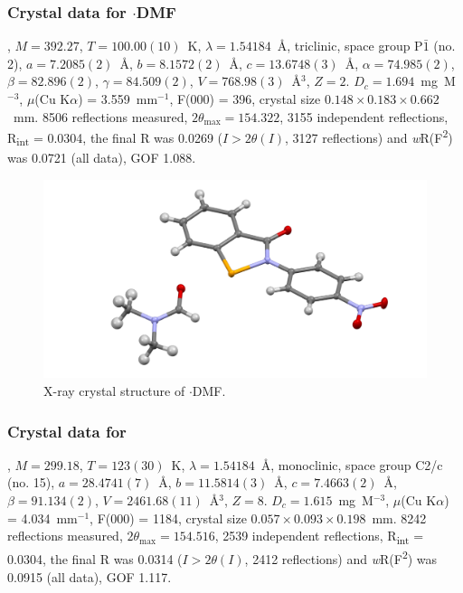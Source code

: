 \begin{refsection}
\subsubsection{Crystal data for \texorpdfstring{$\cdot$DMF}{C16 H15 N3 O4 Se}}
, $M=392.27$, $T=100.00(10)$~K, $\lambda=1.54184$~\AA, triclinic, space group P$\bar{1}$ (no. 2), $a = 7.2085(2)$~\AA, $b = 8.1572(2)$~\AA, $c = 13.6748(3)$~\AA, $\alpha = 74.985(2)$\degree, $\beta = 82.896(2)$\degree, $\gamma = 84.509(2)$\degree, $V = 768.98(3)$~\AA$^{3}$, $Z = 2$. $D_{c}= 1.694$~mg~M$^{-3}$, $\mu$(Cu K$\alpha$) = 3.559~mm$^{-1}$, F(000) = 396, crystal size $0.148 \times 0.183 \times 0.662$~mm. 8506 reflections measured, $2\theta_{\mathrm{max}}=154.322$\degree, 3155 independent reflections, R\textsubscript{int} = 0.0304, the final R was 0.0269 ($I > 2\theta(I)$, 3127 reflections) and \emph{w}R(F\textsuperscript{2}) was 0.0721 (all data), GOF 1.088.

\begin{figure}
  \includegraphics[width=0.6\linewidth]{Figures/ebs-4no2-dmf-xtal.pdf}
  \caption{X-ray crystal structure of \texorpdfstring{$\cdot$DMF}{C16 H15 N3 O4 Se}.}
\end{figure}

\subsubsection{Crystal data for \texorpdfstring{}{C14 H8 N2 O Se}}
, $M=299.18$, $T=123(30)$~K, $\lambda=1.54184$~\AA, monoclinic, space group C2/c (no. 15), $a = 28.4741(7)$~\AA, $b = 11.5814(3)$~\AA, $c = 7.4663(2)$~\AA, $\beta = 91.134(2)$\degree, $V = 2461.68(11)$~\AA$^{3}$, $Z = 8$. $D_{c}= 1.615$~mg~M$^{-3}$, $\mu$(Cu K$\alpha$) = 4.034~mm$^{-1}$, F(000) = 1184, crystal size $0.057 \times 0.093 \times 0.198$~mm. 8242 reflections measured, $2\theta_{\mathrm{max}}=154.516$\degree, 2539 independent reflections, R\textsubscript{int} = 0.0304, the final R was 0.0314 ($I > 2\theta(I)$, 2412 reflections) and \emph{w}R(F\textsuperscript{2}) was 0.0915 (all data), GOF 1.117.


\end{refsection}
